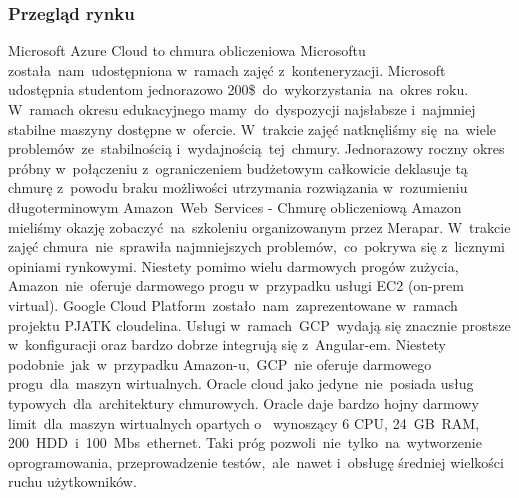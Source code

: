 \subsubsection{\textnormal{Przegląd rynku}}
\indent Microsoft Azure Cloud to chmura obliczeniowa Microsoftu została~nam~udostępniona w~ramach zajęć z~konteneryzacji.
Microsoft udostępnia studentom jednorazowo 200\$~do~wykorzystania~na~okres roku.
W~ramach okresu edukacyjnego mamy~do~dyspozycji najsłabsze i~najmniej stabilne maszyny dostępne w~ofercie.
W~trakcie zajęć natknęliśmy się~na~wiele problemów~ze~stabilnością i~wydajnością~tej~chmury.
Jednorazowy roczny okres próbny w~połączeniu z~ograniczeniem budżetowym całkowicie deklasuje tą chmurę z~powodu braku możliwości utrzymania rozwiązania w~rozumieniu długoterminowym \newline
\indent Amazon~Web~Services - Chmurę obliczeniową Amazon mieliśmy okazję zobaczyć~na~szkoleniu organizowanym przez Merapar.
W~trakcie zajęć chmura~nie~sprawiła najmniejszych problemów,~co~pokrywa się z~licznymi opiniami rynkowymi.
Niestety pomimo wielu darmowych progów zużycia, Amazon~nie~oferuje darmowego progu w~przypadku usługi EC2 (\gls{on-prem} virtual). \newline
\indent Google Cloud Platform~zostało~nam~zaprezentowane w~ramach projektu PJATK cloudelina.
Usługi w~ramach~GCP~wydają się znacznie prostsze w~konfiguracji oraz bardzo dobrze integrują się z~Angular-em.
Niestety podobnie~jak~w~przypadku Amazon-u,~GCP~nie oferuje darmowego progu~dla~maszyn wirtualnych. \newline
\indent Oracle cloud jako jedyne~nie~posiada usług typowych~dla~architektury chmurowych.
Oracle daje bardzo hojny darmowy limit~dla~maszyn wirtualnych opartych o~ wynoszący 6 CPU, 24~GB~RAM, 200~HDD~i~100~Mbs~ethernet.
Taki próg pozwoli~nie~tylko~na~wytworzenie oprogramowania, przeprowadzenie testów,~ale~nawet i~obsługę średniej wielkości ruchu użytkowników.
